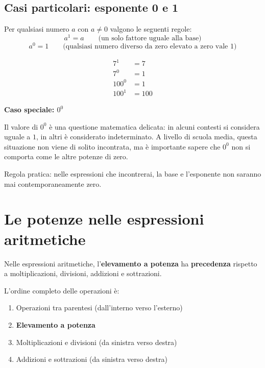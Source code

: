 \subsection{Casi particolari: esponente 0 e 1}

\begin{regola}
  Per qualsiasi numero $a$ con $a \neq 0$ valgono le seguenti regole:
  \[
    a^1 = a \qquad \text{(un solo fattore uguale alla base)}
  \]
  \[
    a^0 = 1 \qquad \text{(qualsiasi numero diverso da zero elevato a zero vale 1)}
  \]
\end{regola}

\begin{esempio}
  \begin{align*}
    7^1   & = 7   \\
    7^0   & = 1   \\
    100^0 & = 1   \\
    100^1 & = 100
  \end{align*}
\end{esempio}

\begin{attenzione}
  \textbf{Caso speciale: $0^0$}

  Il valore di $0^0$ è una questione matematica delicata: in alcuni contesti
  si considera uguale a $1$, in altri è considerato indeterminato.
  A livello di scuola media, questa situazione non viene di solito incontrata,
  ma è importante sapere che $0^0$ non si comporta come le altre potenze di zero.

  Regola pratica: nelle espressioni che incontrerai, la base e l'esponente
  non saranno mai contemporaneamente zero.
\end{attenzione}

\section{Le potenze nelle espressioni aritmetiche}

\begin{regola}
  Nelle espressioni aritmetiche, l'\textbf{elevamento a potenza} ha
  \textbf{precedenza} rispetto a moltiplicazioni, divisioni, addizioni e sottrazioni.

  L'ordine completo delle operazioni è:
  \begin{enumerate}[leftmargin=2em]
    \item Operazioni tra parentesi (dall'interno verso l'esterno)
    \item \textbf{Elevamento a potenza}
    \item Moltiplicazioni e divisioni (da sinistra verso destra)
    \item Addizioni e sottrazioni (da sinistra verso destra)
  \end{enumerate}
\end{regola}


